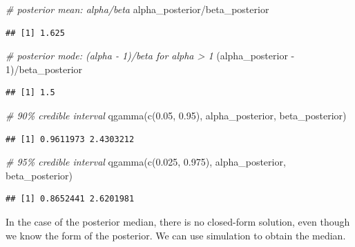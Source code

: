 \documentclass[
]{book}
\newenvironment{Shaded}{\begin{snugshade}}{\end{snugshade}}
\newcommand{\CommentTok}[1]{\textcolor[rgb]{0.56,0.35,0.01}{\textit{#1}}}
\newcommand{\DecValTok}[1]{\textcolor[rgb]{0.00,0.00,0.81}{#1}}
\newcommand{\FloatTok}[1]{\textcolor[rgb]{0.00,0.00,0.81}{#1}}
\newcommand{\FunctionTok}[1]{\textcolor[rgb]{0.00,0.00,0.00}{#1}}
\newcommand{\NormalTok}[1]{#1}
\newcommand{\SpecialCharTok}[1]{\textcolor[rgb]{0.00,0.00,0.00}{#1}}
\begin{document}
\begin{Shaded}
\begin{Highlighting}[]
\CommentTok{\# posterior mean: alpha/beta}
\NormalTok{alpha\_posterior}\SpecialCharTok{/}\NormalTok{beta\_posterior}
\end{Highlighting}
\end{Shaded}

\begin{verbatim}
## [1] 1.625
\end{verbatim}

\begin{Shaded}
\begin{Highlighting}[]
\CommentTok{\# posterior mode: (alpha {-} 1)/beta for alpha \textgreater{} 1}
\NormalTok{(alpha\_posterior }\SpecialCharTok{{-}} \DecValTok{1}\NormalTok{)}\SpecialCharTok{/}\NormalTok{beta\_posterior}
\end{Highlighting}
\end{Shaded}

\begin{verbatim}
## [1] 1.5
\end{verbatim}

\begin{Shaded}
\begin{Highlighting}[]
\CommentTok{\# 90\% credible interval}
\FunctionTok{qgamma}\NormalTok{(}\FunctionTok{c}\NormalTok{(}\FloatTok{0.05}\NormalTok{, }\FloatTok{0.95}\NormalTok{), alpha\_posterior, beta\_posterior)}
\end{Highlighting}
\end{Shaded}

\begin{verbatim}
## [1] 0.9611973 2.4303212
\end{verbatim}

\begin{Shaded}
\begin{Highlighting}[]
\CommentTok{\# 95\% credible interval}
\FunctionTok{qgamma}\NormalTok{(}\FunctionTok{c}\NormalTok{(}\FloatTok{0.025}\NormalTok{, }\FloatTok{0.975}\NormalTok{), alpha\_posterior, beta\_posterior)}
\end{Highlighting}
\end{Shaded}

\begin{verbatim}
## [1] 0.8652441 2.6201981
\end{verbatim}

In the case of the posterior median, there is no closed-form solution,
even though we know the form of the posterior. We can use simulation to
obtain the median.
\end{document}
